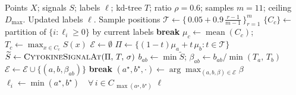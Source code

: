 \begin{algorithm}[t]
\caption{\textsc{PathDensityMerge} — fixed-point fusion under density-ridge constraint}
\label{alg:merge}
\begin{algorithmic}[1]
\Require Points $X$; signals $S$; labels $\ell$; kd-tree $T$; ratio $\rho{=}0.6$; samples $m{=}11$; ceiling $D_{\max}$.
\Ensure  Updated labels $\ell$.
\State Sample positions $\mathcal{T} \gets \{\,0.05 + 0.9\,\tfrac{r-1}{m-1}\,\}_{r=1}^{m}$
\Repeat
    \State $\{C_c\} \gets$ partition of $\{i : \ell_i \ge 0\}$ by current labels
     \textbf{break} \EndIf
    \State $\mu_c \gets \operatorname{mean}(C_c)$;\; $T_c \gets \max_{x \in C_c} S(x)$ 
    \State $\mathcal{E} \gets \emptyset$ 
        \State $\Pi \gets \{(1-t)\mu_a + t\,\mu_b : t \in \mathcal{T}\}$
        \State $\widetilde S \gets \textsc{CytokineSignalAt}(\Pi,\,T,\,\sigma)$
        \State $b_{ab} \gets \min \widetilde S$;\; $\beta_{ab} \gets b_{ab}/\min(T_a,\,T_b)$
         $\mathcal{E} \gets \mathcal{E} \cup \{(a,b,\beta_{ab})\}$ \EndIf
    \EndFor
     \textbf{break} \EndIf
    \State $(a^{\star}, b^{\star}, \cdot) \gets \arg\max_{(a,b,\beta) \in \mathcal{E}} \beta$ 
    \State $\ell_i \gets \min(a^{\star}, b^{\star}) \quad \forall\, i \in C_{\,\max(a^{\star},b^{\star})}$
\State \Return $\ell$
\end{algorithmic}
\end{algorithm}

